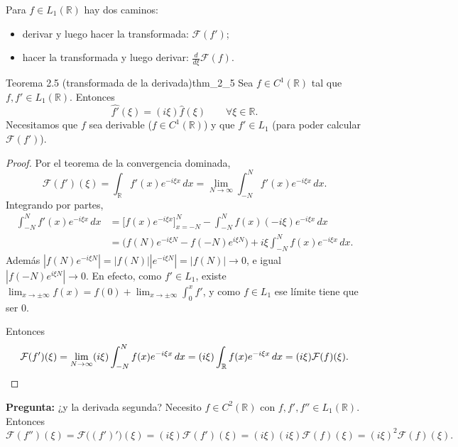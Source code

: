 Para $f \in L_1(\mathbb{R})$ hay dos caminos:
\begin{itemize}
\item derivar y luego hacer la transformada: $\mathcal{F}(f')$;
\item hacer la transformada y luego derivar: $\frac{d}{d\xi}\mathcal{F}(f)$.
\end{itemize}

\begin{teorema}{Teorema 2.5 (transformada de la derivada)}{thm_2_5}
Sea $f \in C^1(\mathbb{R})$ tal que $f, f' \in L_1(\mathbb{R})$. Entonces
\[
\widehat{f'}(\xi) = (i\xi)\hat{f}(\xi) \qquad \forall\xi \in \mathbb{R}.
\]
Necesitamos que $f$ sea derivable ($f \in C^1(\mathbb{R})$) y que $f' \in L_1$ (para poder calcular $\mathcal{F}(f')$).
\end{teorema}

\begin{proof}
Por el teorema de la convergencia dominada,
\[
\mathcal{F}(f')(\xi) = \int_{\mathbb{R}}f'(x)e^{-i\xi x}\,dx = \lim_{N\to\infty}\int_{-N}^{N}f'(x)e^{-i\xi x}\,dx.
\]
Integrando por partes,
\begin{align*}
\int_{-N}^{N}f'(x)e^{-i\xi x}\,dx &= \Big[f(x)e^{-i\xi x}\Big]_{x=-N}^{N} - \int_{-N}^{N}f(x)(-i\xi)e^{-i\xi x}\,dx \\
&= \big(f(N)e^{-i\xi N} - f(-N)e^{i\xi N}\big) + i\xi\int_{-N}^{N}f(x)e^{-i\xi x}\,dx.
\end{align*}
Además $|f(N)e^{-i\xi N}| = |f(N)||e^{-i\xi N}| = |f(N)| \to 0$, e igual $|f(-N)e^{i\xi N}| \to 0$. En efecto, como $f' \in L_1$, existe $\lim_{x\to\pm\infty}f(x) = f(0) + \lim_{x\to\pm\infty}\int_0^x f'$, y como $f \in L_1$ ese límite tiene que ser $0$.

Entonces
\[
\mathcal{F}(f')(\xi) = \lim_{N\to\infty}(i\xi)\int_{-N}^{N}f(x)e^{-i\xi x}\,dx = (i\xi)\int_{\mathbb{R}}f(x)e^{-i\xi x}\,dx = (i\xi)\mathcal{F}(f)(\xi). \qedhere
\]
\end{proof}

\textbf{Pregunta:} ¿y la derivada segunda? Necesito $f \in C^2(\mathbb{R})$ con $f, f', f'' \in L_1(\mathbb{R})$. Entonces
\[
\mathcal{F}(f'')(\xi) = \mathcal{F}\big((f')'\big)(\xi) = (i\xi)\mathcal{F}(f')(\xi) = (i\xi)(i\xi)\mathcal{F}(f)(\xi) = (i\xi)^2\mathcal{F}(f)(\xi).
\]

